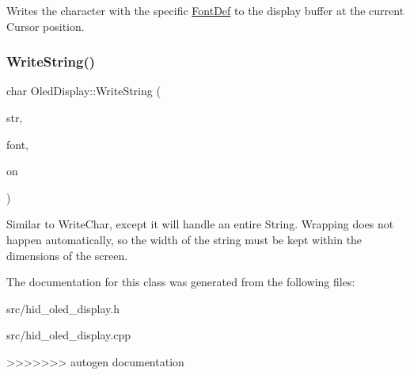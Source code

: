 Writes the character with the specific \hyperlink{struct_font_def}{Font\+Def} to the display buffer at the current Cursor position. \mbox{\label{classdaisy_1_1_oled_display_a73d813ed52db74e97b738aa51ec1df16}} 
\subsubsection{\texorpdfstring{Write\+String()}{WriteString()}}
{\footnotesize\ttfamily char Oled\+Display\+::\+Write\+String (\begin{DoxyParamCaption}\item[{char $\ast$}]{str,  }\item[{\hyperlink{struct_font_def}{Font\+Def}}]{font,  }\item[{bool}]{on }\end{DoxyParamCaption})}

Similar to Write\+Char, except it will handle an entire String. Wrapping does not happen automatically, so the width of the string must be kept within the dimensions of the screen. 

The documentation for this class was generated from the following files\+:\begin{DoxyCompactItemize}
\item 
src/hid\+\_\+oled\+\_\+display.\+h\item 
src/hid\+\_\+oled\+\_\+display.\+cpp\end{DoxyCompactItemize}
>>>>>>> autogen documentation
